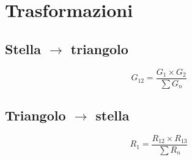 \documentclass{article}
\begin{document}
    \hspace{-.6cm} %
    \begin{minipage}[t]{.3\textwidth}

        \section*{Trasformazioni}
            \vspace{-.2cm}

            \subsection*{Stella \(\rightarrow\) triangolo}

                \[
                    G_{12} = \frac{G_1 \times G_2}{\sum G_n}
                \]

            \subsection*{Triangolo \(\rightarrow\) stella}

                \[
                    R_1 = \frac{R_{12} \times R_{13}}{\sum R_n}
                \]

    \end{minipage}
    \hfill
\end{document}
